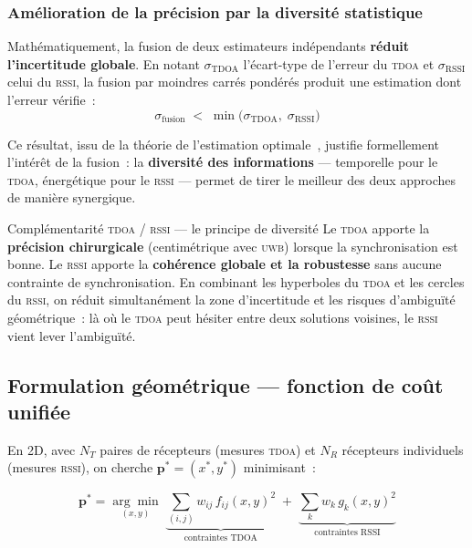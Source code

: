 \documentclass[12pt, a4paper]{article}
\newcommand{\TDOA}{\textsc{tdoa}}
\newcommand{\RSSI}{\textsc{rssi}}
\newcommand{\UWB}{\textsc{uwb}}
\begin{document}
\subsubsection{Amélioration de la précision par la diversité statistique}

Mathématiquement, la fusion de deux estimateurs indépendants \textbf{réduit
l'incertitude globale}. En notant $\sigma_{\text{TDOA}}$ l'écart-type de l'erreur
du \TDOA{} et $\sigma_{\text{RSSI}}$ celui du \RSSI{}, la fusion par moindres
carrés pondérés produit une estimation dont l'erreur vérifie~:
\begin{equation*}
  \sigma_{\text{fusion}} \;<\; \min\!\bigl(\sigma_{\text{TDOA}},\; \sigma_{\text{RSSI}}\bigr)
\end{equation*}

Ce résultat, issu de la théorie de l'estimation optimale~\cite{Evennou2007},
justifie formellement l'intérêt de la fusion~: la \textbf{diversité des informations}
--- temporelle pour le \TDOA{}, énergétique pour le \RSSI{} --- permet de tirer
le meilleur des deux approches de manière synergique.

\begin{summarybox}{Complémentarité \TDOA{} / \RSSI{} — le principe de diversité}
Le \TDOA{} apporte la \textbf{précision chirurgicale} (centimétrique avec \UWB{})
lorsque la synchronisation est bonne. Le \RSSI{} apporte la \textbf{cohérence
globale et la robustesse} sans aucune contrainte de synchronisation. En combinant
les hyperboles du \TDOA{} et les cercles du \RSSI{}, on réduit simultanément la
zone d'incertitude et les risques d'ambiguïté géométrique~: là où le \TDOA{} peut
hésiter entre deux solutions voisines, le \RSSI{} vient \og{}lever l'ambiguïté\fg{}.
\end{summarybox}

\subsection{Formulation géométrique — fonction de coût unifiée}

En 2D, avec $N_T$ paires de récepteurs (mesures \TDOA{}) et $N_R$ récepteurs
individuels (mesures \RSSI{}), on cherche $\mathbf{p}^* = (x^*, y^*)$ minimisant~:

\begin{keybox}
\begin{equation}
  \mathbf{p}^* = \underset{(x,y)}{\arg\min}\;
  \underbrace{\sum_{(i,j)} w_{ij}\,f_{ij}(x,y)^2}_{\text{contraintes TDOA}}
  \;+\;
  \underbrace{\sum_{k} w_k\,g_k(x,y)^2}_{\text{contraintes RSSI}}
  \label{eq:cout_fusion}
\end{equation}
\end{keybox}
\end{document}
